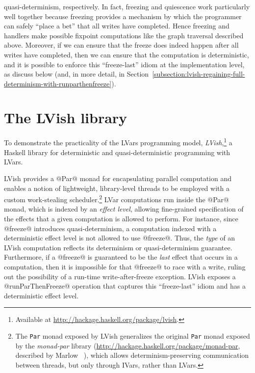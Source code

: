 quasi-determinism, respectively.  In fact, freezing and quiescence
work particularly well together because freezing provides a mechanism
by which the programmer can safely ``place a bet'' that all writes
have completed.  Hence freezing and handlers make possible fixpoint
computations like the graph traversal described above.  Moreover, if
we can ensure that the freeze does indeed happen after all writes have
completed, then we can ensure that the computation is deterministic,
and it is possible to enforce this ``freeze-last'' idiom at the
implementation level, as  discuss below (and, in more detail, in
Section~\ref{subsection:lvish-regaining-full-determinism-with-runparthenfreeze}).

\section{The LVish library}\label{s:intro-lvish}

To demonstrate the practicality of the LVars programming model, 
\emph{LVish},\footnote{Available at
  \url{http://hackage.haskell.org/package/lvish}.} a Haskell library
for deterministic and quasi-deterministic programming with LVars.

LVish provides a @Par@ monad for encapsulating parallel computation
and enables a notion of lightweight, library-level threads to be
employed with a custom work-stealing scheduler.\footnote{The
  \lstinline|Par| monad exposed by LVish generalizes the original
  \lstinline|Par| monad exposed by the \emph{monad-par} library
  ({\url{http://hackage.haskell.org/package/monad-par}}, described by
  Marlow \etal~\cite{monad-par}), which allows determinism-preserving
  communication between threads, but only through IVars, rather than
  LVars.}  LVar computations run inside the @Par@ monad, which is
indexed by an \emph{effect level}, allowing fine-grained specification
of the effects that a given computation is allowed to perform.  For
instance, since @freeze@ introduces quasi-determinism, a computation
indexed with a deterministic effect level is not allowed to use
@freeze@.  Thus, the \emph{type} of an LVish computation reflects its
determinism or quasi-determinism guarantee.  Furthermore, if a
@freeze@ is guaranteed to be the \emph{last} effect that occurs in a
computation, then it is impossible for that @freeze@ to race with a
write, ruling out the possibility of a run-time write-after-freeze
exception.  LVish exposes a @runParThenFreeze@ operation that captures
this ``freeze-last'' idiom and has a deterministic effect level.

